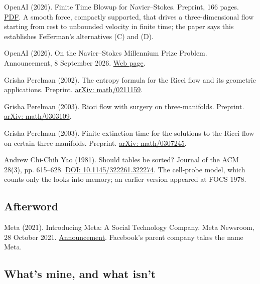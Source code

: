 \documentclass[11pt,twoside]{article}
\theoremstyle{thielethm}
\theoremstyle{thieledef}
\theoremstyle{thieledef}
\theoremstyle{thieledef}
\theoremstyle{thielethm}
\theoremstyle{thieleobs}
\theoremstyle{thielethm}
\begin{document}
\noindent OpenAI (2026). Finite Time Blowup for Navier--Stokes. Preprint, 166 pages. \href{https://cdn.openai.com/pdf/32d9f210-8b73-45e0-91bc-82a30aef8a9a/navier-stokes.pdf}{PDF}. A smooth force, compactly supported, that drives a three-dimensional flow starting from rest to unbounded velocity in finite time; the paper says this establishes Fefferman's alternatives (C) and (D).
\par\medskip

\noindent OpenAI (2026). On the Navier--Stokes Millennium Prize Problem. Announcement, 8 September 2026. \href{https://openai.com/index/navier-stokes-solution/}{Web page}.
\par\medskip

\noindent Grisha Perelman (2002). The entropy formula for the Ricci flow and its geometric applications. Preprint. \href{https://arxiv.org/abs/math/0211159}{arXiv: math/0211159}.
\par\medskip

\noindent Grisha Perelman (2003). Ricci flow with surgery on three-manifolds. Preprint. \href{https://arxiv.org/abs/math/0303109}{arXiv: math/0303109}.
\par\medskip

\noindent Grisha Perelman (2003). Finite extinction time for the solutions to the Ricci flow on certain three-manifolds. Preprint. \href{https://arxiv.org/abs/math/0307245}{arXiv: math/0307245}.
\par\medskip

\noindent Andrew Chi-Chih Yao (1981). Should tables be sorted? Journal of the ACM 28(3), pp. 615--628. \href{https://doi.org/10.1145/322261.322274}{DOI: 10.1145/322261.322274}. The cell-probe model, which counts only the looks into memory; an earlier version appeared at FOCS 1978.
\par\medskip

\subsection*{Afterword}

\noindent Meta (2021). Introducing Meta: A Social Technology Company. Meta Newsroom, 28 October 2021. \href{https://about.fb.com/news/2021/10/facebook-company-is-now-meta/}{Announcement}. Facebook's parent company takes the name Meta.
\par\medskip

\subsection*{What's mine, and what isn't}
\end{document}
